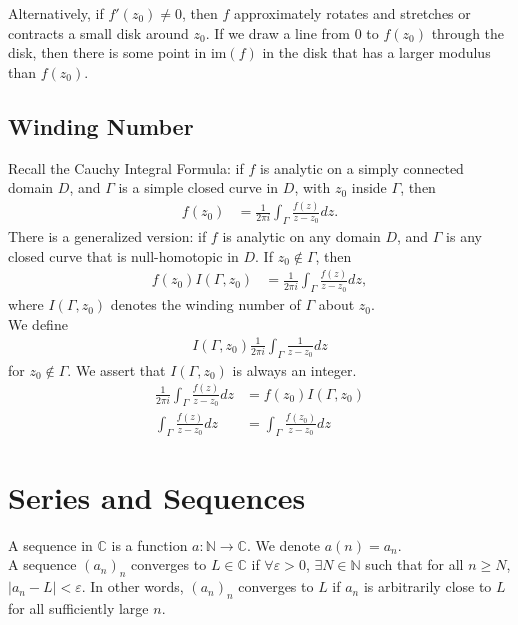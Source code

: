 \documentclass[10pt]{extarticle}
\newcommand{\N}{\mathbb{N}}
\newcommand{\C}{\mathbb{C}}
\begin{document}
\begin{description}
      Alternatively, if $f'(z_0)\neq 0$, then $f$ approximately rotates and stretches or contracts a small disk around $z_0$. If we draw a line from $0$ to $f(z_0)$ through the disk, then there is some point in $\text{im}(f)$ in the disk that has a larger modulus than $f(z_0)$.
  \end{description}
  \subsection{Winding Number}%
  Recall the Cauchy Integral Formula: if $f$ is analytic on a simply connected domain $D$, and $\Gamma$ is a simple closed curve in $D$, with $z_0$ inside $\Gamma$, then
  \begin{align*}
    f(z_0) &= \frac{1}{2\pi i}\int_{\Gamma}\frac{f(z)}{z-z_0}dz.
  \end{align*}
  There is a generalized version: if $f$ is analytic on any domain $D$, and $\Gamma$ is any closed curve that is null-homotopic in $D$. If $z_0\notin \Gamma$, then
  \begin{align*}
    f(z_0)I(\Gamma,z_0) &= \frac{1}{2\pi i}\int_{\Gamma}\frac{f(z)}{z-z_0}dz,
  \end{align*}
  where $I(\Gamma,z_0)$ denotes the winding number of $\Gamma$ about $z_0$.\\

  We define
  \begin{align*}
    I(\Gamma,z_0)\frac{1}{2\pi i}\int_{\Gamma}\frac{1}{z-z_0}dz
  \end{align*}
  for $z_0\notin \Gamma$. We assert that $I(\Gamma,z_0)$ is always an integer.
  \begin{align*}
    \frac{1}{2\pi i}\int_{\Gamma}\frac{f(z)}{z-z_0}dz &= f(z_0)I(\Gamma,z_0)\\
    \int_{\Gamma}\frac{f(z)}{z-z_0}dz &= \int_{\Gamma}\frac{f(z_0)}{z-z_0}dz
  \end{align*}
  \section{Series and Sequences}%
  A sequence in $\C$ is a function $a: \N\rightarrow \C$. We denote $a(n) = a_n$.\\

  A sequence $(a_n)_n$ converges to $L\in \C$ if $\forall \varepsilon > 0$, $\exists N\in \N$ such that for all $n\geq N$, $|a_n - L| < \varepsilon$. In other words, $(a_n)_n$ converges to $L$ if $a_n$ is arbitrarily close to $L$ for all sufficiently large $n$.\\
\end{document}
